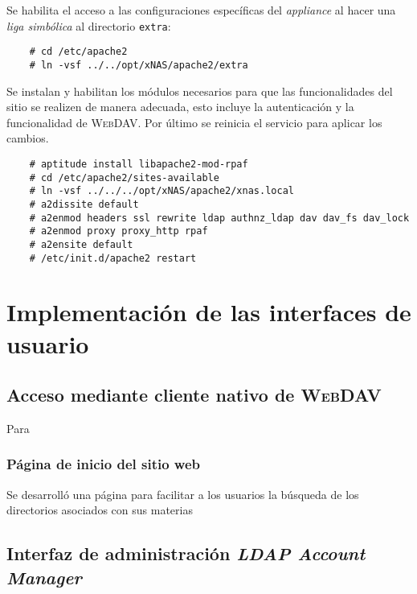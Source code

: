 Se habilita el acceso a las configuraciones espec\'{i}ficas del \textit{appliance} al hacer una \textit{liga simb\'{o}lica} al directorio \texttt{extra}:

{
\scriptsize
\linespread{1}
\begin{verbatim}
    # cd /etc/apache2
    # ln -vsf ../../opt/xNAS/apache2/extra
\end{verbatim}
}

Se instalan y habilitan los m\'{odulos} necesarios para que las funcionalidades del sitio se realizen de manera adecuada, esto incluye la autenticaci\'{o}n y la funcionalidad de \textsc{WebDAV}. Por \'{u}ltimo se reinicia el servicio para aplicar los cambios.

{
\scriptsize
\linespread{1}
\begin{verbatim}
    # aptitude install libapache2-mod-rpaf
    # cd /etc/apache2/sites-available
    # ln -vsf ../../../opt/xNAS/apache2/xnas.local
    # a2dissite default
    # a2enmod headers ssl rewrite ldap authnz_ldap dav dav_fs dav_lock
    # a2enmod proxy proxy_http rpaf
    # a2ensite default
    # /etc/init.d/apache2 restart
\end{verbatim}
}


    \section {Implementaci\'{o}n de las interfaces de usuario}

      \subsection {Acceso mediante cliente nativo de \textsc{WebDAV}}

Para

        \subsubsection{P\'{a}gina de inicio del sitio web}

Se desarroll\'{o} una p\'{a}gina para facilitar a los usuarios la b\'{u}squeda de los directorios asociados con sus materias

      \subsection {Interfaz de administraci\'{o}n \textit{LDAP Account Manager}}

